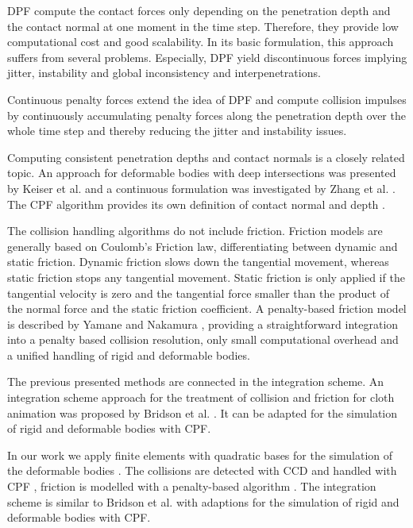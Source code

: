 DPF compute the contact forces only depending on the penetration depth and the contact normal at one moment in the time step. Therefore, they provide low computational cost and good scalability. In its basic formulation, this approach suffers from several problems. Especially, DPF yield discontinuous forces implying jitter, instability and global inconsistency and interpenetrations.

Continuous penalty forces \cite{TANG2012} extend the idea of DPF and compute collision impulses by continuously accumulating penalty forces along the penetration depth over the whole time step and thereby reducing the jitter and instability issues.


Computing consistent penetration depths and contact normals is a closely related topic. An approach for deformable bodies with deep intersections was presented by Keiser et al. \cite{KEISER2004} and a continuous formulation was investigated by Zhang et al. \cite{ZHANG2014}. The CPF algorithm provides its own definition of contact normal and depth \cite{TANG2012}.

The collision handling algorithms do not include friction. Friction models are generally based on Coulomb's Friction law, differentiating between dynamic and static friction. Dynamic friction slows down the tangential movement, whereas static friction stops any tangential movement. Static friction is only applied if the tangential velocity is zero and the tangential force smaller than the product of the normal force and the static friction coefficient.
A penalty-based friction model is described by Yamane and Nakamura \cite{YAMANE2006}, providing a straightforward integration into a penalty based collision resolution, only small computational overhead and a unified handling of rigid and deformable bodies.

The previous presented methods are connected in the integration scheme.
An integration scheme approach for the treatment of collision and friction for cloth animation was proposed by Bridson et al. \cite{BRIDSON2002}. It can be adapted for the simulation of rigid and deformable bodies with CPF.

In our work we apply finite elements with quadratic bases for the simulation of the deformable bodies \cite{WEBER2011}. The collisions are detected with CCD \cite{PROVOT1997} and handled with CPF \cite{TANG2012}, friction is modelled with a penalty-based algorithm \cite{YAMANE2006}. The integration scheme is similar to Bridson et al. \cite{BRIDSON2002} with adaptions for the simulation of rigid and deformable bodies with CPF.
